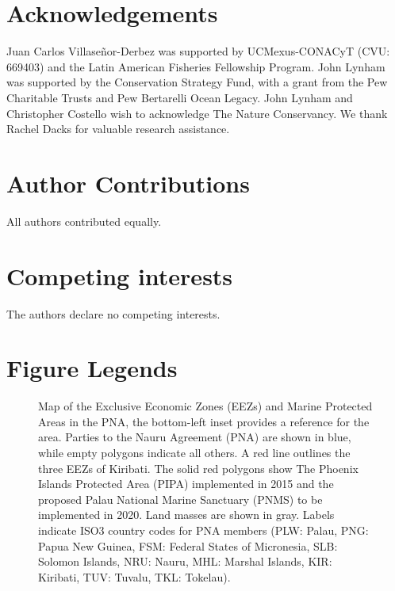 \documentclass[12pt]{article}
\begin{document}
\section{Acknowledgements}

Juan Carlos Villaseñor-Derbez was supported by UCMexus-CONACyT (CVU: 669403) and the Latin American Fisheries Fellowship Program. John Lynham was supported by the Conservation Strategy Fund, with a grant from the Pew Charitable Trusts and Pew Bertarelli Ocean Legacy. John Lynham and Christopher Costello wish to acknowledge The Nature Conservancy. We thank Rachel Dacks for valuable research assistance.

\section{Author Contributions}

All authors contributed equally.

\section{Competing interests}

The authors declare no competing interests.

\FloatBarrier

\section{Figure Legends}

\begin{figure}[htbp]
\centering
\caption{\label{fig:PNA_map}Map of the Exclusive Economic Zones (EEZs) and Marine Protected Areas in the PNA, the bottom-left inset provides a reference for the area. Parties to the Nauru Agreement (PNA) are shown in blue, while empty polygons indicate all others. A red line outlines the three EEZs of Kiribati. The solid red polygons show The Phoenix Islands Protected Area (PIPA) implemented in 2015 and the proposed Palau National Marine Sanctuary (PNMS) to be implemented in 2020. Land masses are shown in gray. Labels indicate ISO3 country codes for PNA members (PLW: Palau, PNG: Papua New Guinea, FSM: Federal States of Micronesia, SLB: Solomon Islands, NRU: Nauru, MHL: Marshal Islands, KIR: Kiribati, TUV: Tuvalu, TKL: Tokelau).}
\end{figure}
\end{document}
